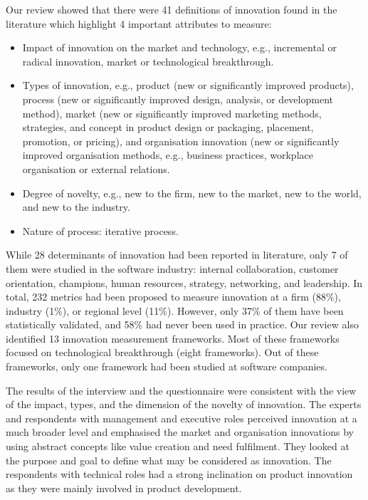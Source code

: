 \documentclass[sigconf,review]{acmart}
\begin{document}
Our review showed that there were 41 definitions of innovation found in the literature which highlight 4 important attributes to measure: 
\begin{itemize}
    \item Impact of innovation on the market and technology, e.g., incremental or radical innovation, market or technological breakthrough.
    \item Types of innovation, e.g., product (new or significantly improved products), process (new or significantly improved design, analysis, or development method), market (new or significantly improved marketing methods, strategies, and concept in product design or packaging, placement, promotion, or pricing), and organisation innovation (new or significantly improved organisation methods, e.g., business practices, workplace organisation or external relations.
    \item Degree of novelty, e.g., new to the firm, new to the market, new to the world, and new to the industry.
    \item Nature of process: iterative process.
\end{itemize}

While 28 determinants of innovation had been reported in literature, only 7 of them were studied in the software industry: internal collaboration, customer orientation, champions, human resources, strategy, networking, and leadership. In total, 232 metrics had been proposed to measure innovation at a firm (88\%), industry (1\%), or regional level (11\%). However, only 37\% of them have been statistically validated, and 58\% had never been used in practice. Our review also identified 13 innovation measurement frameworks. Most of these frameworks focused on technological breakthrough (eight frameworks). Out of these frameworks, only one framework had been studied at software companies. 

The results of the interview and the questionnaire were consistent with the view of the impact, types, and the dimension of the novelty of innovation. The experts and respondents with management and executive roles perceived innovation at a much broader level and emphasised the market and organisation innovations by using abstract concepts like value creation and need fulfilment. They looked at the purpose and goal to define what may be considered as innovation. The respondents with technical roles had a strong inclination on product innovation as they were mainly involved in product development.
\end{document}
